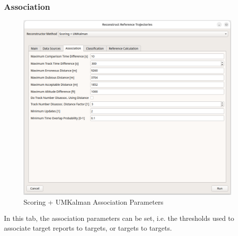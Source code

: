 \subsubsection{Association}

\begin{figure}[H]
    \center
      \includegraphics[width=16cm]{figures/dialog_scorum_assoc.png}
    \caption{Scoring + UMKalman Association Parameters}
\end{figure}

In this tab, the association parameters can be set, i.e. the thresholds used to associate target reports to targets, or targets to targets. \\

